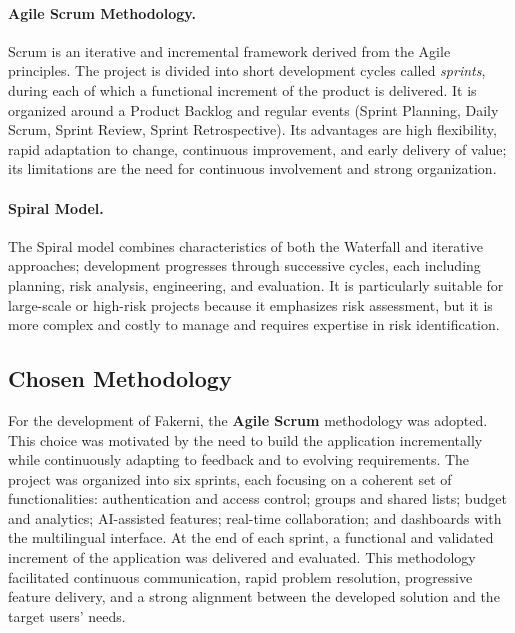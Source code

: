 \documentclass[12pt,a4paper,oneside]{report}
\begin{document}
\paragraph{Agile Scrum Methodology.}
Scrum is an iterative and incremental framework derived from the Agile principles.
The project is divided into short development cycles called \emph{sprints}, during
each of which a functional increment of the product is delivered. It is organized
around a Product Backlog and regular events (Sprint Planning, Daily Scrum, Sprint
Review, Sprint Retrospective). Its advantages are high flexibility, rapid
adaptation to change, continuous improvement, and early delivery of value; its
limitations are the need for continuous involvement and strong organization.

\paragraph{Spiral Model.}
The Spiral model combines characteristics of both the Waterfall and iterative
approaches; development progresses through successive cycles, each including
planning, risk analysis, engineering, and evaluation. It is particularly suitable
for large-scale or high-risk projects because it emphasizes risk assessment, but
it is more complex and costly to manage and requires expertise in risk
identification.

\subsection{Chosen Methodology}
For the development of Fakerni, the \textbf{Agile Scrum} methodology was adopted.
This choice was motivated by the need to build the application incrementally while
continuously adapting to feedback and to evolving requirements. The project was
organized into six sprints, each focusing on a coherent set of functionalities:
authentication and access control; groups and shared lists; budget and analytics;
AI-assisted features; real-time collaboration; and dashboards with the
multilingual interface. At the end of each sprint, a functional and validated
increment of the application was delivered and evaluated. This methodology
facilitated continuous communication, rapid problem resolution, progressive
feature delivery, and a strong alignment between the developed solution and the
target users' needs.
\end{document}
